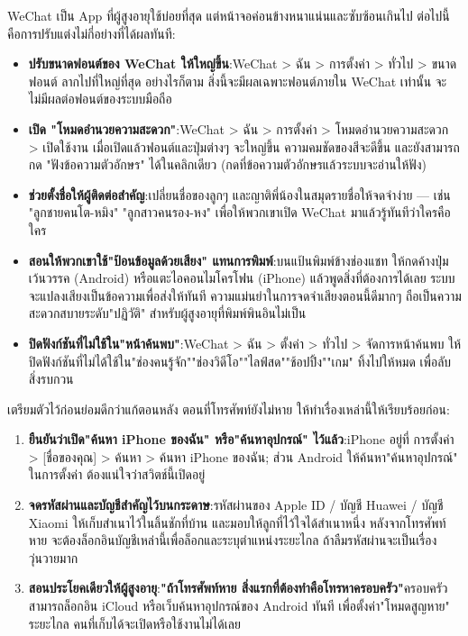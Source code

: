 
WeChat เป็น App ที่ผู้สูงอายุใช้บ่อยที่สุด แต่หน้าจอค่อนข้างหนาแน่นและซับซ้อนเกินไป ต่อไปนี้คือการปรับแต่งไม่กี่อย่างที่ได้ผลทันที:

\begin{itemize}
  \item \textbf{ปรับขนาดฟอนต์ของ WeChat ให้ใหญ่ขึ้น}:WeChat > ฉัน > การตั้งค่า > ทั่วไป > ขนาดฟอนต์ ลากไปที่ใหญ่ที่สุด อย่างไรก็ตาม สิ่งนี้จะมีผลเฉพาะฟอนต์ภายใน WeChat เท่านั้น จะไม่มีผลต่อฟอนต์ของระบบมือถือ
  \item \textbf{เปิด "โหมดอำนวยความสะดวก"}:WeChat > ฉัน > การตั้งค่า > โหมดอำนวยความสะดวก > เปิดใช้งาน เมื่อเปิดแล้วฟอนต์และปุ่มต่างๆ จะใหญ่ขึ้น ความคมชัดของสีจะดีขึ้น และยังสามารถกด "ฟังข้อความตัวอักษร" ได้ในคลิกเดียว (กดที่ข้อความตัวอักษรแล้วระบบจะอ่านให้ฟัง)
  \item \textbf{ช่วยตั้งชื่อให้ผู้ติดต่อสำคัญ}:เปลี่ยนชื่อของลูกๆ และญาติพี่น้องในสมุดรายชื่อให้จดจำง่าย — เช่น "ลูกชายคนโต-หมิง" "ลูกสาวคนรอง-หง" เพื่อให้พวกเขาเปิด WeChat มาแล้วรู้ทันทีว่าใครคือใคร
  \item \textbf{สอนให้พวกเขาใช้"ป้อนข้อมูลด้วยเสียง" แทนการพิมพ์}:บนแป้นพิมพ์ข้างช่องแชท ให้กดค้างปุ่มเว้นวรรค (Android) หรือแตะไอคอนไมโครโฟน (iPhone) แล้วพูดสิ่งที่ต้องการได้เลย ระบบจะแปลงเสียงเป็นข้อความเพื่อส่งให้ทันที ความแม่นยำในการจดจำเสียงตอนนี้ดีมากๆ ถือเป็นความสะดวกสบายระดับ"ปฏิวัติ" สำหรับผู้สูงอายุที่พิมพ์พินอินไม่เป็น
  \item \textbf{ปิดฟังก์ชันที่ไม่ใช้ใน"หน้าค้นพบ"}:WeChat > ฉัน > ตั้งค่า > ทั่วไป > จัดการหน้าค้นพบ ให้ปิดฟังก์ชันที่ไม่ได้ใช้ใน"ช่องคนรู้จัก""ช่องวิดีโอ""ไลฟ์สด""ช้อปปิ้ง""เกม" ทิ้งไปให้หมด เพื่อลับสิ่งรบกวน
\end{itemize}


เตรียมตัวไว้ก่อนย่อมดีกว่าแก้ตอนหลัง ตอนที่โทรศัพท์ยังไม่หาย ให้ทำเรื่องเหล่านี้ให้เรียบร้อยก่อน:

\begin{enumerate}
  \item \textbf{ยืนยันว่าเปิด"ค้นหา iPhone ของฉัน" หรือ"ค้นหาอุปกรณ์" ไว้แล้ว}:iPhone อยู่ที่ การตั้งค่า > [ชื่อของคุณ] > ค้นหา > ค้นหา iPhone ของฉัน; ส่วน Android ให้ค้นหา"ค้นหาอุปกรณ์" ในการตั้งค่า ต้องแน่ใจว่าสวิตช์นี้เปิดอยู่
  \item \textbf{จดรหัสผ่านและบัญชีสำคัญไว้บนกระดาษ}:รหัสผ่านของ Apple ID / บัญชี Huawei / บัญชี Xiaomi ให้เก็บสำเนาไว้ในลิ้นชักที่บ้าน และมอบให้ลูกที่ไว้ใจได้สำเนาหนึ่ง หลังจากโทรศัพท์หาย จะต้องล็อกอินบัญชีเหล่านี้เพื่อล็อกและระบุตำแหน่งระยะไกล ถ้าลืมรหัสผ่านจะเป็นเรื่องวุ่นวายมาก
  \item \textbf{สอนประโยคเดียวให้ผู้สูงอายุ}:\textbf{"ถ้าโทรศัพท์หาย สิ่งแรกที่ต้องทำคือโทรหาครอบครัว"}ครอบครัวสามารถล็อกอิน iCloud หรือเว็บค้นหาอุปกรณ์ของ Android ทันที เพื่อตั้งค่า"โหมดสูญหาย" ระยะไกล คนที่เก็บได้จะเปิดหรือใช้งานไม่ได้เลย
\end{enumerate}

